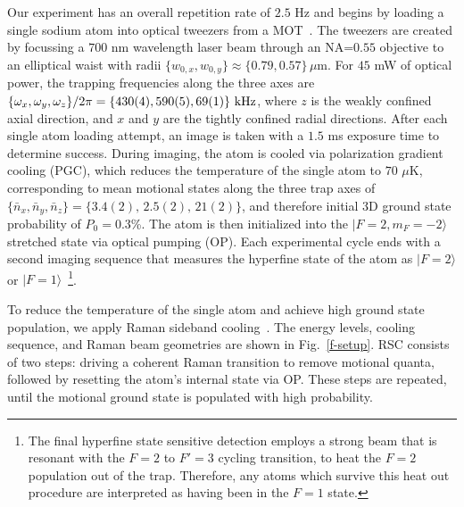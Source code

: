 \documentclass[aps,prl,twocolumn,groupedaddress]{revtex4-1}
\begin{document}
Our experiment has an overall repetition rate of $2.5$ Hz and
begins by loading a single sodium atom into optical tweezers from a MOT~\cite{Hutzler2017-LightShifts}.
The tweezers are created by focussing a $700$ nm wavelength laser beam through an NA=$0.55$ objective to an elliptical waist with radii $\{w_{0,x},w_{0,y}\}\approx \{0.79,0.57\}\,\mu$m.
For $45$ mW of optical power, the trapping frequencies along the three axes are
$\{\omega_x,\omega_y,\omega_z\}/2\pi = \{430(4), 590(5), 69(1)\}\ \text{\text{kHz}}$,
where  $z$ is the weakly confined axial direction,
and  $x$ and $y$ are the tightly confined radial directions.
After each single atom loading attempt, an image is taken with a $1.5$ ms exposure time
to determine success.
During  imaging, the atom is cooled via polarization gradient cooling (PGC),
which reduces the temperature of the single atom to $70$ $\mu$K,
corresponding to mean motional states along the three trap axes of
$\{\bar n_x, \bar n_y, \bar n_z\}=\{3.4(2),\, 2.5(2),\, 21(2)\}$, and therefore initial 3D ground state probability of $P_0=0.3$\%.
The atom is then initialized  into
the $|F=2, m_F=-2\rangle$ stretched state via optical pumping (OP).
Each experimental cycle ends with a second imaging sequence that measures the hyperfine state of the atom as $|F=2\rangle$ or $|F=1\rangle$~\footnote{The final hyperfine state sensitive detection employs a strong beam that is resonant with the $F=2$ to $F'=3$ cycling transition, to heat the $F=2$ population out of the trap.  Therefore, any atoms which survive this heat out procedure are interpreted as having been in the $F=1$ state.}.%


To  reduce the temperature of the single atom and
 achieve high ground state population, we apply Raman sideband cooling~\cite{Monroe1995, Kaufman2012}.
The  energy levels, cooling sequence, and Raman beam geometries 
are shown in Fig.~\ref{f-setup}. RSC consists of two steps:
driving a coherent Raman transition  to remove motional quanta, followed by resetting the atom's internal state via OP.
These  steps are  repeated, until the motional ground state is populated with high probability.
\end{document}
